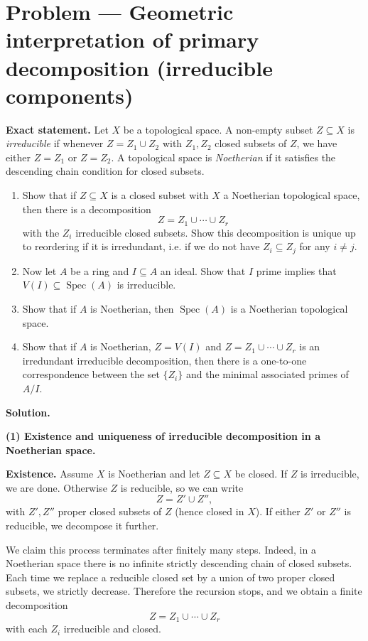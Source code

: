 \documentclass[12pt,a4paper]{article}
\DeclareMathOperator{\Spec}{Spec}
\theoremstyle{plain}
\theoremstyle{definition}      %
\begin{document}
	\section*{Problem — Geometric interpretation of primary decomposition (irreducible components)}
	
	\textbf{Exact statement.}
	Let $X$ be a topological space. A non-empty subset $Z\subseteq X$ is \emph{irreducible} if whenever
	$Z=Z_1\cup Z_2$ with $Z_1,Z_2$ closed subsets of $Z$, we have either $Z=Z_1$ or $Z=Z_2$.
	A topological space is \emph{Noetherian} if it satisfies the descending chain condition for closed subsets.
	
	\begin{enumerate}
		\item
		Show that if $Z\subseteq X$ is a closed subset with $X$ a Noetherian topological space, then there is a decomposition
		\[
		Z=Z_1\cup\cdots\cup Z_r
		\]
		with the $Z_i$ irreducible closed subsets. Show this decomposition is unique up to reordering if it is irredundant,
		i.e. if we do not have $Z_i\subseteq Z_j$ for any $i\neq j$.
		
		\item
		Now let $A$ be a ring and $I\subseteq A$ an ideal. Show that $I$ prime implies that $V(I)\subseteq \Spec(A)$ is irreducible.
		
		\item
		Show that if $A$ is Noetherian, then $\Spec(A)$ is a Noetherian topological space.
		
		\item
		Show that if $A$ is Noetherian, $Z=V(I)$ and $Z=Z_1\cup\cdots\cup Z_r$ is an irredundant irreducible decomposition,
		then there is a one-to-one correspondence between the set $\{Z_i\}$ and the minimal associated primes of $A/I$.
	\end{enumerate}
	
	\textbf{Solution.}
	
	\textbf{(1) Existence and uniqueness of irreducible decomposition in a Noetherian space.}
	
	\medskip
	\textbf{Existence.}
	Assume $X$ is Noetherian and let $Z\subseteq X$ be closed.
	If $Z$ is irreducible, we are done. Otherwise $Z$ is reducible, so we can write
	\[
	Z=Z'\cup Z'',
	\]
	with $Z',Z''$ proper closed subsets of $Z$ (hence closed in $X$).
	If either $Z'$ or $Z''$ is reducible, we decompose it further.
	
	We claim this process terminates after finitely many steps.
	Indeed, in a Noetherian space there is no infinite strictly descending chain of closed subsets.
	Each time we replace a reducible closed set by a union of two proper closed subsets, we strictly decrease.
	Therefore the recursion stops, and we obtain a finite decomposition
	\[
	Z=Z_1\cup\cdots\cup Z_r
	\]
	with each $Z_i$ irreducible and closed.
	
\end{document}
